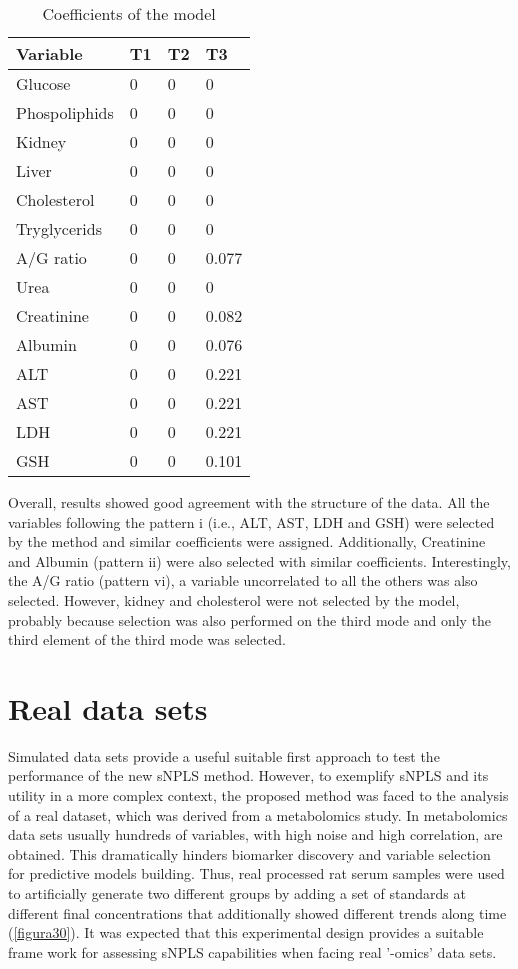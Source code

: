 \begin{table}[hbtp]
\centering
\begin{tabular}{@{}llll@{}}
\toprule
Variable      & T1 & T2 & T3    \\ \midrule
Glucose       & 0  & 0  & 0     \\
Phospoliphids & 0  & 0  & 0     \\
Kidney        & 0  & 0  & 0     \\
Liver         & 0  & 0  & 0     \\
Cholesterol   & 0  & 0  & 0     \\
Tryglycerids  & 0  & 0  & 0     \\
A/G ratio     & 0  & 0  & 0.077 \\
Urea          & 0  & 0  & 0     \\
Creatinine    & 0  & 0  & 0.082 \\
Albumin       & 0  & 0  & 0.076 \\
ALT           & 0  & 0  & 0.221 \\
AST           & 0  & 0  & 0.221 \\
LDH           & 0  & 0  & 0.221 \\
GSH           & 0  & 0  & 0.101 \\ \bottomrule
\end{tabular}%
\caption[Coefficients of the model for the data driven synthetic data set]{Coefficients of the model}
\label{table:results_synth2}
\end{table}

Overall, results showed good agreement with the structure of the data. All the variables  following the pattern i (i.e., ALT, AST, LDH and GSH) were selected by the method and similar coefficients  were assigned. Additionally, Creatinine and Albumin (pattern ii) were also selected with similar coefficients. Interestingly,  the A/G ratio (pattern vi), a variable uncorrelated to all the others was also selected. However, kidney and cholesterol were not selected by the model, probably because selection was also performed on the third mode and only the third element of the third mode was selected.


\section{Real data sets}
\label{sec:realdata}
Simulated data sets provide a useful suitable first approach to test the performance of the new sNPLS method. However, to exemplify sNPLS and its utility in a more complex context, the proposed method was faced to the analysis of a real dataset, which was derived from a metabolomics study. In metabolomics data sets usually hundreds of variables, with high noise and high correlation, are obtained. This dramatically hinders biomarker discovery and variable selection for predictive models building.  Thus, real processed rat serum samples were used to artificially generate two different groups by adding a set of standards at different final concentrations that additionally showed different trends along time (\autoref{figura30}). It was expected that this experimental design provides a suitable frame work for assessing sNPLS capabilities when facing real '-omics' data sets.


